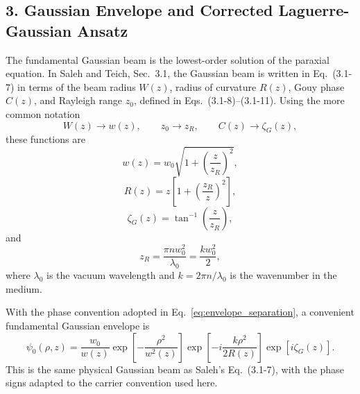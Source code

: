 \begin{resolucao}[Solution]
\subsection*{3. Gaussian Envelope and Corrected Laguerre-Gaussian Ansatz}

    The fundamental Gaussian beam is the lowest-order solution of the paraxial equation. In Saleh and Teich, Sec.~3.1, the Gaussian beam is written in Eq.~(3.1-7) in terms of the beam radius $W(z)$, radius of curvature $R(z)$, Gouy phase $C(z)$, and Rayleigh range $z_0$, defined in Eqs.~(3.1-8)--(3.1-11). Using the more common notation
    \[
        W(z)\to w(z),
        \qquad
        z_0\to z_R,
        \qquad
        C(z)\to \zeta_G(z),
    \]
    these functions are
    \begin{equation}
        w(z)
        =
        w_0
        \sqrt{
            1+\left(\frac{z}{z_R}\right)^2
        },
        \label{eq:wz}
    \end{equation}
    \begin{equation}
        R(z)
        =
        z
        \left[
            1+
            \left(
                \frac{z_R}{z}
            \right)^2
        \right],
        \label{eq:Rz}
    \end{equation}
    \begin{equation}
        \zeta_G(z)
        =
        \tan^{-1}
        \left(
            \frac{z}{z_R}
        \right),
        \label{eq:gouy}
    \end{equation}
    and
    \begin{equation}
        z_R
        =
        \frac{\pi n w_0^2}{\lambda_0}
        =
        \frac{k w_0^2}{2},
        \label{eq:rayleigh_range}
    \end{equation}
    where $\lambda_0$ is the vacuum wavelength and $k=2\pi n/\lambda_0$ is the wavenumber in the medium.

    With the phase convention adopted in Eq.~\eqref{eq:envelope_separation}, a convenient fundamental Gaussian envelope is
    \begin{equation}
        \psi_0(\rho,z)
        =
        \frac{w_0}{w(z)}
        \exp\left[
            -\frac{\rho^2}{w^2(z)}
        \right]
        \exp\left[
            -i\frac{k\rho^2}{2R(z)}
        \right]
        \exp\left[
            i\zeta_G(z)
        \right].
        \label{eq:fundamental_gaussian_envelope}
    \end{equation}
    This is the same physical Gaussian beam as Saleh's Eq.~(3.1-7), with the phase signs adapted to the carrier convention used here.


\end{resolucao}
